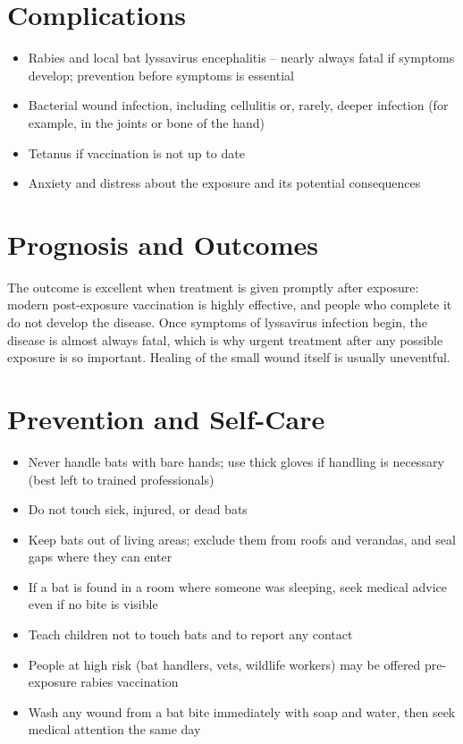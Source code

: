 \section*{Complications}
\begin{itemize}
    \item Rabies and local bat lyssavirus encephalitis -- nearly always fatal if symptoms develop; prevention before symptoms is essential
    \item Bacterial wound infection, including cellulitis or, rarely, deeper infection (for example, in the joints or bone of the hand)
    \item Tetanus if vaccination is not up to date
    \item Anxiety and distress about the exposure and its potential consequences
\end{itemize}

\section*{Prognosis and Outcomes}
The outcome is excellent when treatment is given promptly after exposure: modern post-exposure vaccination is highly effective, and people who complete it do not develop the disease. Once symptoms of lyssavirus infection begin, the disease is almost always fatal, which is why urgent treatment after any possible exposure is so important. Healing of the small wound itself is usually uneventful.

\section*{Prevention and Self-Care}
\begin{itemize}
    \item Never handle bats with bare hands; use thick gloves if handling is necessary (best left to trained professionals)
    \item Do not touch sick, injured, or dead bats
    \item Keep bats out of living areas; exclude them from roofs and verandas, and seal gaps where they can enter
    \item If a bat is found in a room where someone was sleeping, seek medical advice even if no bite is visible
    \item Teach children not to touch bats and to report any contact
    \item People at high risk (bat handlers, vets, wildlife workers) may be offered pre-exposure rabies vaccination
    \item Wash any wound from a bat bite immediately with soap and water, then seek medical attention the same day
\end{itemize}

